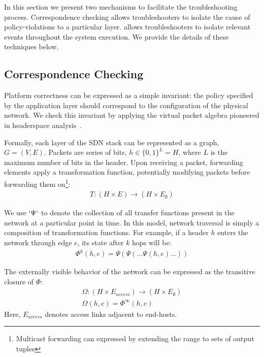 In this section we present two mechanisms to facilitate the troubleshooting
process. Correspondence checking allows troubleshooters to isolate
the cause of policy-violations to a particular layer. \Simulator{}
allows troubleshooters to isolate relevant events throughout the system
execution. We provide the details of these techniques below. 


\subsection{Correspondence Checking}

Platform correctness can be expressed as a simple invariant:
the policy specified by the application layer should correspond to the
configuration of the
physical network. We check this invariant by applying the virtual packet
algebra pioneered in headerspace analysis~\cite{hsa}. 

Formally, each layer of the SDN stack can be represented as a graph,
$G = (V, E)$. Packets are series of bits, $h \in \{0,1\}^L = H$,
where $L$ is the maximum number of bits in the header. Upon receiving a packet,
forwarding elements apply a transformation function, potentially modifying
packets before forwarding them on\footnote{Multicast forwarding can expressed
by extending the range to sets of output tuples}:
\begin{align*}
T: (H \times E) \rightarrow (H \times E_{\emptyset})
\end{align*}

We use $`\Psi`$ to denote the collection of all transfer functions present in
the network at a particular point in time. In this model, network traversal is simply a composition of transformation
functions. For example, if a header $h$ enters the network through edge
$e$, its state after $k$ hops will be:
\begin{align*}
\Phi^k(h,e) = \Psi(\Psi(\dots \Psi(h,e)\dots))
\end{align*}

The externally visible behavior of the network can be expressed as the
transitive closure of $\Phi$:
\begin{align*}
\Omega: (H \times E_{access}) \rightarrow (H \times E_{\emptyset}) \\
\Omega(h,e) = \Phi^{\infty}(h,e)
\end{align*}
Here, $E_{access}$ denotes access links adjacent to end-hosts.

